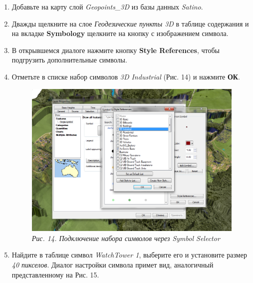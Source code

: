 \documentclass[]{book}
\theoremstyle{definition}
\theoremstyle{definition}
\theoremstyle{definition}
\theoremstyle{remark}
\begin{document}
\begin{enumerate}
\def\labelenumi{\arabic{enumi}.}
\item
  Добавьте на карту слой \emph{Geopoints\_3D} из базы данных
  \emph{Satino}.
\item
  Дважды щелкните на слое \emph{Геодезические пункты 3D} в таблице
  содержания и на вкладке \textbf{Symbology} щелкните на кнопку с
  изображением символа.
\item
  В открывшемся диалоге нажмите кнопку \textbf{Style References}, чтобы
  подгрузить дополнительные символы.
\item
  Отметьте в списке набор символов \emph{3D Industrial} (Рис. 14) и
  нажмите \textbf{ОК}.

  \begin{figure}
  \centering
  \includegraphics{images/Ex18/image16.png}
  \caption{\emph{Рис. 14. Подключение набора символов через Symbol
  Selector}}
  \end{figure}
\item
  Найдите в таблице символ \emph{WatchTower 1}, выберите его и
  установите размер \emph{40 пикселов}. Диалог настройки символа примет
  вид, аналогичный представленному на Рис. 15.


\end{enumerate}
\end{document}
